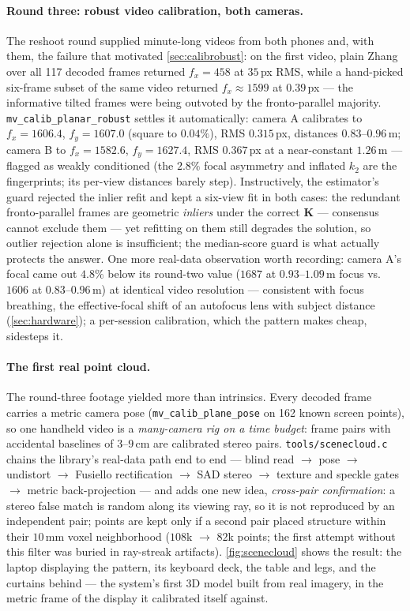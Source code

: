 \documentclass[11pt]{article}
\theoremstyle{definition}
\newcommand{\mat}[1]{\mathbf{#1}}
\newcommand{\K}{\mat{K}}
\newcommand{\code}[1]{\texttt{#1}}
\begin{document}
\paragraph{Round three: robust video calibration, both cameras.} The
reshoot round supplied minute-long videos from both phones and, with
them, the failure that motivated \autoref{sec:calibrobust}: on the
first video, plain Zhang over all 117 decoded frames returned
$f_x=458$ at $35$\,px RMS, while a hand-picked six-frame subset of the
same video returned $f_x\approx1599$ at $0.39$\,px --- the informative
tilted frames were being outvoted by the fronto-parallel majority.
\code{mv\_calib\_planar\_robust} settles it automatically: camera A
calibrates to $f_x{=}1606.4$, $f_y{=}1607.0$ (square to $0.04\%$),
RMS $0.315$\,px, distances $0.83$--$0.96$\,m; camera B to
$f_x{=}1582.6$, $f_y{=}1627.4$, RMS $0.367$\,px at a near-constant
$1.26$\,m --- flagged as weakly conditioned (the $2.8\%$ focal
asymmetry and inflated $k_2$ are the fingerprints; its per-view
distances barely step). Instructively, the estimator's guard rejected
the inlier refit and kept a six-view fit in both cases: the redundant
fronto-parallel frames are geometric \emph{inliers} under the correct
$\K$ --- consensus cannot exclude them --- yet refitting on them still
degrades the solution, so outlier rejection alone is insufficient; the
median-score guard is what actually protects the answer. One more
real-data observation worth recording: camera A's focal came out
$4.8\%$ below its round-two value ($1687$ at $0.93$--$1.09$\,m focus
vs.\ $1606$ at $0.83$--$0.96$\,m) at identical video resolution ---
consistent with focus breathing, the effective-focal shift of an
autofocus lens with subject distance (\autoref{sec:hardware}); a
per-session calibration, which the pattern makes cheap, sidesteps it.

\paragraph{The first real point cloud.} The round-three footage
yielded more than intrinsics. Every decoded frame carries a metric
camera pose (\code{mv\_calib\_plane\_pose} on 162 known screen
points), so one handheld video is a \emph{many-camera rig on a time
budget}: frame pairs with accidental baselines of $3$--$9$\,cm are
calibrated stereo pairs. \code{tools/scenecloud.c} chains the
library's real-data path end to end --- blind read $\to$ pose $\to$
undistort $\to$ Fusiello rectification $\to$ SAD stereo $\to$ texture
and speckle gates $\to$ metric back-projection --- and adds one new
idea, \emph{cross-pair confirmation}: a stereo false match is random
along its viewing ray, so it is not reproduced by an independent
pair; points are kept only if a second pair placed structure within
their $10$\,mm voxel neighborhood ($108$k $\to$ $82$k points; the
first attempt without this filter was buried in ray-streak
artifacts). \autoref{fig:scenecloud} shows the result: the laptop
displaying the pattern, its keyboard deck, the table and legs, and
the curtains behind --- the system's first 3D model built from real
imagery, in the metric frame of the display it calibrated itself
against.
\end{document}
